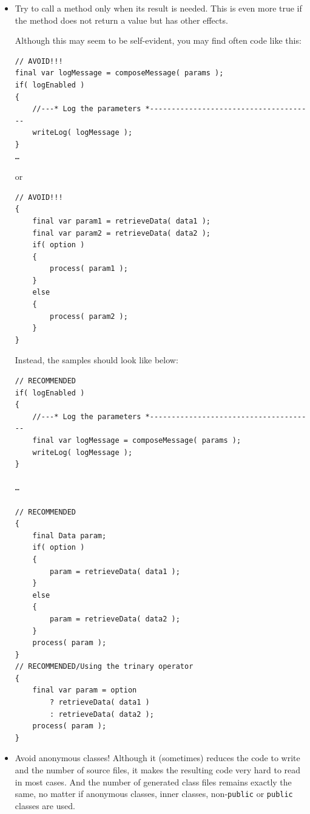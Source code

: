\documentclass[11pt,a4paper, titlepage, parskip=half, headsepline, footsepline, cleardoublepage=current, headheight=1cm]{scrbook}
\begin{document}
\begin{itemize}
{\begin{lstlisting}
    /**
     *  Creates a new instance for {@code MyClass}.
     */
    public MyClass() 
    {                                                
        // INSTEAD DO IT IN THE CONSTRUCTOR!!
        final var propertyName = readConfig( "user.property" );
        m_Field = System.getProperty( propertyName );
    }   //  MyClass()
}
//  class MyClass    
\end{lstlisting}}

\item{Try to call a method only when its result is needed. This is even more true if the method does not return a value but has other effects.

Although this may seem to be self-evident, you may find often code like this:
\begin{lstlisting}
// AVOID!!!
final var logMessage = composeMessage( params );
if( logEnabled )
{
    //---* Log the parameters *--------------------------------------
    writeLog( logMessage );
}
…
\end{lstlisting}
or
\begin{lstlisting}
// AVOID!!!
{
    final var param1 = retrieveData( data1 );
    final var param2 = retrieveData( data2 );
    if( option )
    {
        process( param1 );
    }
    else
    {
        process( param2 );
    }
}
\end{lstlisting}
Instead, the samples should look like below:
\begin{lstlisting}
// RECOMMENDED
if( logEnabled )
{
    //---* Log the parameters *--------------------------------------
    final var logMessage = composeMessage( params );
    writeLog( logMessage );
}

…

// RECOMMENDED
{
    final Data param;
    if( option )
    {
        param = retrieveData( data1 );
    }
    else
    {
        param = retrieveData( data2 );
    }
    process( param );
}
// RECOMMENDED/Using the trinary operator
{
    final var param = option 
        ? retrieveData( data1 )
        : retrieveData( data2 );
    process( param );
}
\end{lstlisting}
}

\item{Avoid anonymous classes! Although it (sometimes) reduces the code to write and the number of source files, it makes the resulting code very hard to read in most cases. And the number of generated class files remains exactly the same, no matter if anonymous classes, inner classes, non-\lstinline|public| or \lstinline|public| classes are used.

}
\end{itemize}
\end{document}
